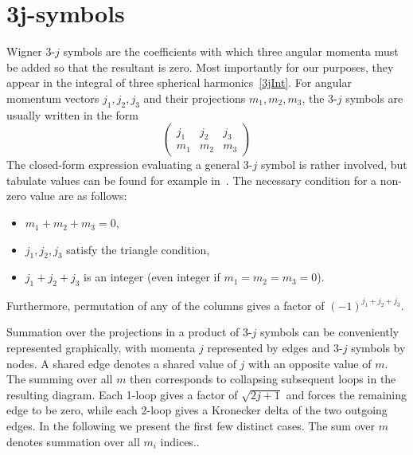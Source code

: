 \section{3j-symbols}
\label{app:3j}

Wigner 3-$j$ symbols are the coefficients with which three angular momenta must be added so that the resultant is zero. Most importantly for our purposes, they appear in the integral of three spherical harmonics~\eqref{3jInt}. For angular momentum vectors $j_1,j_2,j_3$ and their projections $m_1,m_2,m_3$, the 3-$j$ symbols are usually written in the form
\begin{equation}
    \begin{pmatrix} j_1 & j_2 & j_3 \\ m_1 & m_2 & m_3 \end{pmatrix}
\end{equation}
The closed-form expression evaluating a general 3-$j$ symbol is rather involved, but tabulate values can be found for example in~\cite{}. The necessary condition for a non-zero value are as follows:
\begin{itemize}
    \item $m_1+m_2+m_3 =0$,
    \item $j_1,j_2,j_3$ satisfy the triangle condition,
    \item $j_1+j_2+j_3$ is an integer (even integer if $m_1=m_2=m_3=0$).
\end{itemize}
Furthermore, permutation of any of the columns gives a factor of $(-1)^{j_1+j_2+j_3}$.

Summation over the projections in a product of 3-$j$ symbols can be conveniently represented graphically, with momenta $j$ represented by edges and 3-$j$ symbols by nodes. A shared edge denotes a shared value of $j$ with an opposite value of $m$. The summing over all $m$ then corresponds to collapsing subsequent loops in the resulting diagram. Each 1-loop gives a factor of $\sqrt{2j+1}$ and forces the remaining edge to be zero, while each 2-loop gives a Kronecker delta of the two outgoing edges. In the following we present the first few distinct cases. The sum over $m$ denotes summation over all $m_i$ indices..


